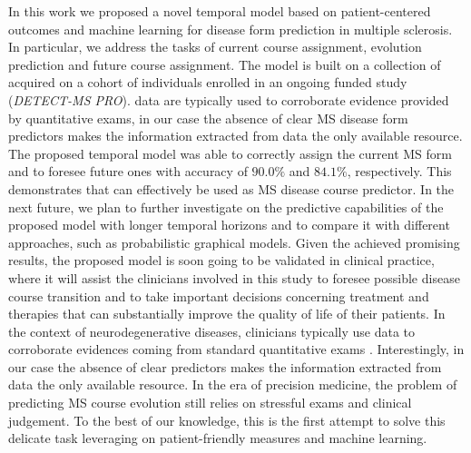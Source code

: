 In this work we proposed a novel temporal model based on patient-centered outcomes and machine learning for disease form prediction in multiple sclerosis.
In particular, we address the tasks of current course assignment, \PCOs evolution prediction and future course assignment. The model is built on a collection of \PCOs acquired on a cohort of individuals enrolled in an ongoing funded study ({\em DETECT-MS PRO}).
\PCOs data are typically used to corroborate evidence provided by quantitative exams, in our case the absence of clear MS disease form predictors makes the information extracted from \PCOs data the only available resource.
The proposed temporal model was able to correctly assign the current MS form and to foresee future ones with accuracy of $90.0\%$ and $84.1\%$, respectively.
This demonstrates that \PCOs can effectively be used as MS disease course predictor.
In the next future, we plan to further investigate on the predictive capabilities of the proposed model with longer temporal horizons and to compare it with different approaches, such as probabilistic graphical models.
Given the achieved promising results, the proposed model is soon going to be validated in clinical practice, where it will assist the clinicians involved in this study to foresee possible disease course transition and to take important decisions concerning treatment and therapies that can substantially improve the quality of life of their patients.
In the context of neurodegenerative diseases, clinicians typically use \PCOs data to corroborate evidences coming from standard quantitative exams \cite{black2013patient}. Interestingly, in our case the absence of clear \SP predictors makes the information extracted from \PCOs data the only available resource.
In the era of precision medicine, the problem of predicting MS course evolution still relies on stressful exams and clinical judgement.
To the best of our knowledge, this is the first attempt to solve this delicate task leveraging on patient-friendly measures and machine learning.


